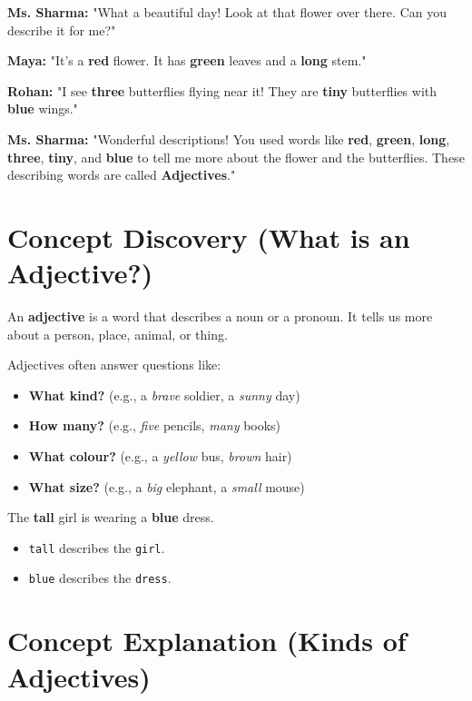 \textbf{Ms. Sharma:} "What a beautiful day! Look at that flower over there. Can you describe it for me?"

\textbf{Maya:} "It's a \textbf{red} flower. It has \textbf{green} leaves and a \textbf{long} stem."

\textbf{Rohan:} "I see \textbf{three} butterflies flying near it! They are \textbf{tiny} butterflies with \textbf{blue} wings."

\textbf{Ms. Sharma:} "Wonderful descriptions! You used words like \textbf{red}, \textbf{green}, \textbf{long}, \textbf{three}, \textbf{tiny}, and \textbf{blue} to tell me more about the flower and the butterflies. These describing words are called \textbf{Adjectives}."

\section{Concept Discovery (What is an Adjective?)}
An \textbf{adjective} is a word that describes a noun or a pronoun. It tells us more about a person, place, animal, or thing.

Adjectives often answer questions like:
\begin{itemize}
    \item \textbf{What kind?} (e.g., a \textit{brave} soldier, a \textit{sunny} day)
    \item \textbf{How many?} (e.g., \textit{five} pencils, \textit{many} books)
    \item \textbf{What colour?} (e.g., a \textit{yellow} bus, \textit{brown} hair)
    \item \textbf{What size?} (e.g., a \textit{big} elephant, a \textit{small} mouse)
\end{itemize}

\begin{examplebox}
    The \textbf{tall} girl is wearing a \textbf{blue} dress.
    \begin{itemize}
        \item \texttt{tall} describes the \texttt{girl}.
        \item \texttt{blue} describes the \texttt{dress}.
    \end{itemize}
\end{examplebox}

\section{Concept Explanation (Kinds of Adjectives)}

